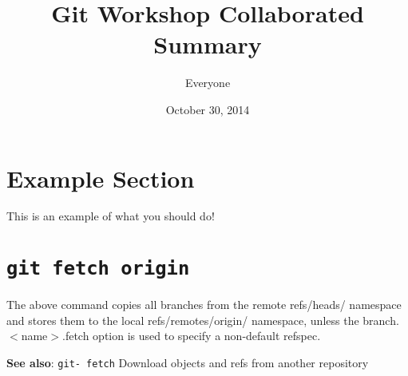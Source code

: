 \documentclass[11pt]{article}
\title{Git Workshop Collaborated Summary}
\author{Everyone}
\date{October 30, 2014}
\begin{document}
\maketitle
\tableofcontents
\pagebreak



\section{Example Section}

This is an example of what you should do!

\section{\texttt{git fetch origin}}
The above command copies all branches from the remote refs/heads/ namespace and stores them to the local refs/remotes/origin/ namespace, unless the branch.$<$name$>$.fetch option is used to specify a non-default refspec.

\textbf{See also}: \texttt{git- fetch} Download objects and refs from another repository
\end{document}
